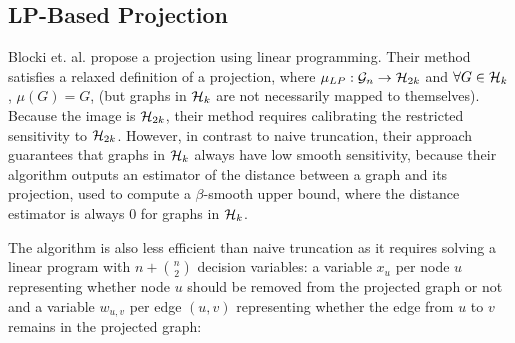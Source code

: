 \subsection*{LP-Based Projection}

Blocki et. al. propose a projection using linear programming. Their method satisfies a relaxed definition of a projection, where $\mu_{LP} : \mathcal{G}_n \to \mathcal{H}_{2k}$ and $\forall G \in \mathcal{H}_{k}$, $\mu(G) = G$, (but graphs in $\mathcal{H}_k$ are not necessarily mapped to themselves). Because the image is $\mathcal{H}_{2k}$, their method requires calibrating the restricted sensitivity to $\mathcal{H}_{2k}$. However, in contrast to naive truncation, their approach guarantees that graphs in $\mathcal{H}_k$ always have low smooth sensitivity, because their algorithm outputs an estimator of the distance between a graph and its projection, used to compute a $\beta$-smooth upper bound, where the distance estimator is always $0$ for graphs in $\mathcal{H}_k$.

The algorithm is also less efficient than naive truncation as it requires solving a  linear program with $n + \binom{n}{2}$ decision variables: a variable $x_u$ per node $u$ representing whether node $u$ should be removed from the projected graph or not and a variable $w_{u,v}$ per edge $(u,v)$ representing whether the edge from $u$ to $v$ remains in the projected graph:

